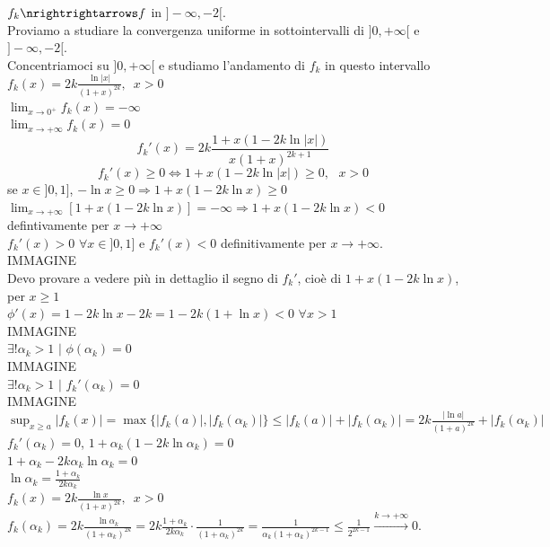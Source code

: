 \documentclass{article}
\begin{document}
$f_k \nrightrightarrows f$ in $]-\infty,-2[$.\\
Proviamo a studiare la convergenza uniforme in sottointervalli di $]0,+\infty[$ e $]-\infty,-2[$.\\
Concentriamoci su $]0,+\infty[$ e studiamo l'andamento di $f_k$ in questo intervallo \\
$f_k(x) = 2k \frac{\ln |x|}{(1+x)^{2k}},\,\,\, x >0$\\
$\lim_{x \rightarrow 0^+} f_k(x) = -\infty$\\
$\lim_{x \rightarrow +\infty} f_k(x) = 0$\\
\begin{equation*}
    f_k' (x) = 2k \frac{1+x(1-2k \ln |x|)}{x(1+x)^{2k+1}}
\end{equation*}
\begin{equation*}
    f_k' (x) \geq 0 \Leftrightarrow 1+x(1-2k \ln |x|) \geq 0,\,\,\,\, x >0
\end{equation*}
se $x \in ]0,1]$, $-\ln x \geq 0 \Rightarrow 1+x(1-2k\ln x)\geq 0$\\
$\lim_{x \rightarrow +\infty} [1+x(1-2k\ln x)]= -\infty \Rightarrow 1+x(1-2k\ln x)<0$ defintivamente per $ x \rightarrow+\infty$\\$f_k' (x) >0\,\, \forall x \in ]0,1]$ e $f_k' (x) <0$ definitivamente per $x \rightarrow +\infty$.\\
IMMAGINE\\
Devo provare a vedere più in dettaglio il segno di $f_k' $, cioè di $1+x(1-2k \ln x)$, per $x \geq 1$\\
$\phi'(x)=1-2k\ln x -2k = 1-2k(1+\ln x)< 0 \,\, \forall x >1$\\
IMMAGINE\\
$\exists ! \alpha_k >1\,\, |\,\, \phi(\alpha_k)=0 $\\
IMMAGINE\\
$\exists ! \alpha_k >1 \,\, |\,\, f_k' (\alpha_k)=0$\\
IMMAGINE\\
$\sup_{x \geq a}|f_k (x)|= \max\{|f_k(a)|,|f_k(\alpha_k)|\}\leq |f_k(a)|+|f_k(\alpha_k)|= 2k \frac{|\ln a|}{(1+a)^{2k}}+|f_k(\alpha_k)|$\\
$f_k' (\alpha_k)=0$, $ 1+\alpha_k (1-2k \ln \alpha_k)=0$\\
$1+\alpha_k - 2 k \alpha_k \ln \alpha_k=0$\\
$\ln\alpha_k= \frac{1+\alpha_k}{2k\alpha_k}$\\
$f_k (x)= 2k \frac{\ln x}{ (1+x)^{2k}},\,\,\, x >0$\\
$f_k(\alpha_k) = 2k\frac{\ln \alpha_k}{(1+\alpha_k)^{2k}}= 2k \frac{1+\alpha_k}{2k\alpha_k}\cdot \frac{1}{(1+\alpha_k)^{2k}}= \frac{1}{\alpha_k(1+\alpha_k)^{2k-1}}\leq \frac{1}{2^{2k-1}}\xrightarrow{k \rightarrow +\infty} 0 $.\\
\end{document}
